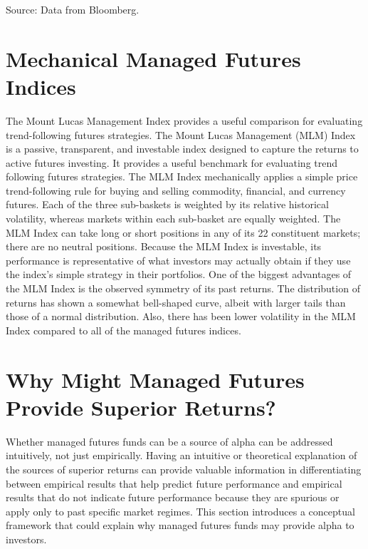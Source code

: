 \documentclass[11pt]{article}
\begin{document}
Source: Data from Bloomberg.

\section*{Mechanical Managed Futures Indices}
The Mount Lucas Management Index provides a useful comparison for evaluating trend-following futures strategies. The Mount Lucas Management (MLM) Index is a passive, transparent, and investable index designed to capture the returns to active futures investing. It provides a useful benchmark for evaluating trend following futures strategies. The MLM Index mechanically applies a simple price trend-following rule for buying and selling commodity, financial, and currency futures. Each of the three sub-baskets is weighted by its relative historical volatility, whereas markets within each sub-basket are equally weighted. The MLM Index can take long or short positions in any of its 22 constituent markets; there are no neutral positions. Because the MLM Index is investable, its performance is representative of what investors may actually obtain if they use the index's simple strategy in their portfolios. One of the biggest advantages of the MLM Index is the observed symmetry of its past returns. The distribution of returns has shown a somewhat bell-shaped curve, albeit with larger tails than those of a normal distribution. Also, there has been lower volatility in the MLM Index compared to all of the managed futures indices.

\section*{Why Might Managed Futures Provide Superior Returns?}
Whether managed futures funds can be a source of alpha can be addressed intuitively, not just empirically. Having an intuitive or theoretical explanation of the sources of superior returns can provide valuable information in differentiating between empirical results that help predict future performance and empirical results that do not indicate future performance because they are spurious or apply only to past specific market regimes. This section introduces a conceptual framework that could explain why managed futures funds may provide alpha to investors.
\end{document}
